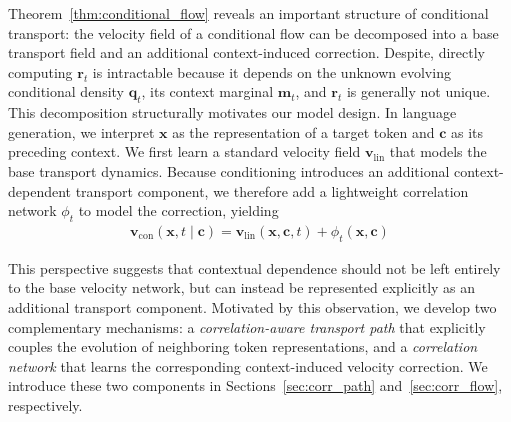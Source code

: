 \documentclass{article} %
\begin{document}
Theorem~\ref{thm:conditional_flow} reveals an important structure of conditional transport: the velocity field of a conditional flow can be decomposed into a base transport field and an additional context-induced correction. Despite, directly computing $\mathbf{r}_t$ is intractable because it depends on the unknown evolving conditional density $\mathbf{q}_t$, its context marginal $\mathbf{m}_t$, and $\mathbf{r}_t$ is generally not unique. This decomposition structurally motivates our model design. In language generation, we interpret $\mathbf{x}$ as the representation of a target token and $\mathbf{c}$ as its preceding context. We first learn a standard velocity field $\mathbf{v}_{\mathrm{lin}}$ that models the base transport dynamics. Because conditioning introduces an additional context-dependent transport component, we therefore add a lightweight correlation network $\phi_{t}$ to model the correction, yielding
\begin{eqnarray}
\mathbf{v}_{\mathrm{con}} (\mathbf{x}, t \mid \mathbf{c})= \mathbf{v}_{\mathrm{lin}} (\mathbf{x}, \mathbf{c}, t)+
\phi_{t}(\mathbf{x},\mathbf{c})
\end{eqnarray}

This perspective suggests that contextual dependence should not be left entirely to the base velocity network, but can instead be represented explicitly as an additional transport component. Motivated by this observation, we develop two complementary mechanisms: a \emph{correlation-aware transport path} that explicitly couples the evolution of neighboring token representations, and a \emph{correlation network} that learns the corresponding context-induced velocity correction. We introduce these two components in Sections~\ref{sec:corr_path} and~\ref{sec:corr_flow}, respectively.
\end{document}
